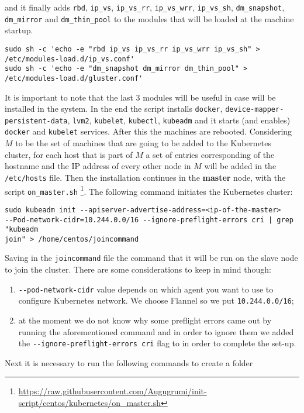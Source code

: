 and it finally adds \texttt{rbd}, \texttt{ip\_vs}, \texttt{ip\_vs\_rr},
\texttt{ip\_vs\_wrr}, \texttt{ip\_vs\_sh}, \texttt{dm\_snapshot},
\texttt{dm\_mirror} and \texttt{dm\_thin\_pool} to the modules that will be
loaded at the machine startup.
\begin{lstlisting}
sudo sh -c 'echo -e "rbd ip_vs ip_vs_rr ip_vs_wrr ip_vs_sh" >  
/etc/modules-load.d/ip_vs.conf'
sudo sh -c 'echo -e "dm_snapshot dm_mirror dm_thin_pool" >  
/etc/modules-load.d/gluster.conf'
\end{lstlisting}
It is important to note that the last 3 modules will be useful in case
\gluster{} will be installed in the system. In the end the script installs
\texttt{docker}, \texttt{device-mapper-persistent-data}, \texttt{lvm2},
\texttt{kubelet}, \texttt{kubectl}, \texttt{kubeadm} and it starts (and enables)
\texttt{docker} and \texttt{kubelet} services. After this the machines are
rebooted. Considering $M$ to be the set of machines that are going to be added
to the Kubernetes cluster, for each host that is part of $M$ a set of entries
corresponding of the hostname and the IP address of every other node in $M$ will
be added in the \texttt{/etc/hosts} file. Then the installation continues in the
\textbf{master} node, with the script \verb!on_master.sh!
\footnote{\url{https://raw.githubusercontent.com/Augugrumi/init-script/centos/kubernetes/on_master.sh}}.
The following command initiates the Kubernetes cluster:
\begin{lstlisting}
sudo kubeadm init --apiserver-advertise-address=<ip-of-the-master> 
--Pod-network-cidr=10.244.0.0/16 --ignore-preflight-errors cri | grep "kubeadm 
join" > /home/centos/joincommand
\end{lstlisting}
Saving in the \texttt{joincommand} file the command that it will be run on the
slave node to join the cluster. There are some considerations to keep in mind
though:
\begin{enumerate}
  \item \verb!--pod-network-cidr! value depends on which agent you want to use
    to configure Kubernetes network. We choose Flannel so we put
    \texttt{10.244.0.0/16};
  \item at the moment we do not know why some preflight errors came out by
    running the aforementioned command and in order to ignore them we added the
    \verb!--ignore-preflight-errors cri! flag to in order to complete the
    set-up.
\end{enumerate}
Next it is necessary to run the following commands to create a folder
